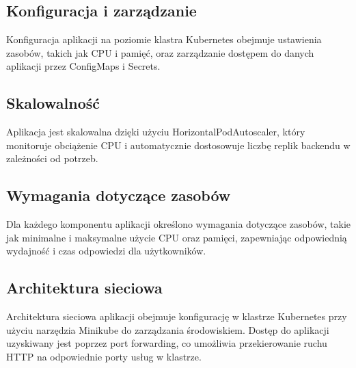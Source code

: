 \documentclass[12pt,a4paper]{article}
\begin{document}
\subsection{Konfiguracja i zarządzanie}
\label{sec:Configuration}

Konfiguracja aplikacji na poziomie klastra Kubernetes obejmuje ustawienia zasobów, takich jak CPU i pamięć, oraz zarządzanie dostępem do danych aplikacji przez ConfigMaps i Secrets.


\subsection{Skalowalność}
\label{sec:Scalability}

Aplikacja jest skalowalna dzięki użyciu HorizontalPodAutoscaler, który monitoruje obciążenie CPU i automatycznie dostosowuje liczbę replik backendu w zależności od potrzeb.

\subsection{Wymagania dotyczące zasobów}
\label{sec:ResourceRequirements}

Dla każdego komponentu aplikacji określono wymagania dotyczące zasobów, takie jak minimalne i maksymalne użycie CPU oraz pamięci, zapewniając odpowiednią wydajność i czas odpowiedzi dla użytkowników.

\subsection{Architektura sieciowa}
\label{sec:NetworkArchitecture}

Architektura sieciowa aplikacji obejmuje konfigurację w klastrze Kubernetes przy użyciu narzędzia Minikube do zarządzania środowiskiem. Dostęp do aplikacji uzyskiwany jest poprzez port forwarding, co umożliwia przekierowanie ruchu HTTP na odpowiednie porty usług w klastrze.

\newpage

\nocite{*} 


 
\end{document}
